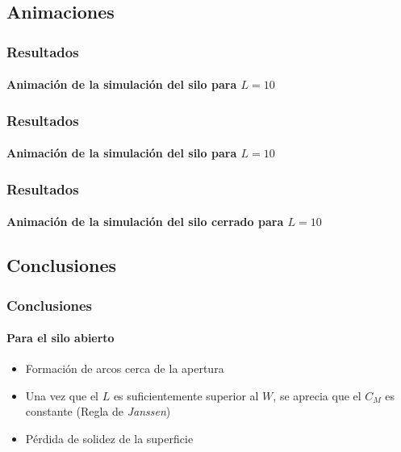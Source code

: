 \documentclass[hyperref={pdfpagelayout=SinglePage}]{beamer}
\begin{document}
\subsection{Animaciones}

\begin{frame}[plain]
\frametitle{Resultados}
\framesubtitle{Animación de la simulación del silo para $L = 10$}
\begin{figure}[H]
	\centering
\end{figure}
\end{frame}

\begin{frame}[plain]
\frametitle{Resultados}
\framesubtitle{Animación de la simulación del silo para $L = 10$}
\begin{figure}[H]
	\centering
\end{figure}
\end{frame}

\begin{frame}[plain]
\frametitle{Resultados}
\framesubtitle{Animación de la simulación del silo cerrado para $L = 10$}
\begin{figure}[H]
	\centering
\end{figure}
\end{frame}

\subsection{Conclusiones}

\begin{frame}
\frametitle{Conclusiones}
\framesubtitle{Para el silo abierto}
\begin{itemize}
	\item Formación de arcos cerca de la apertura
	\item Una vez que el $L$ es suficientemente superior al $W$, se aprecia que el $C_{M}$ es constante (Regla de \textit{Janssen})
	\item Pérdida de solidez de la superficie
\end{itemize}	
\end{frame} 
\end{document}
